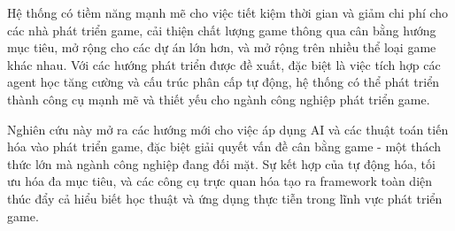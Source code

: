 Hệ thống có tiềm năng mạnh mẽ cho việc tiết kiệm thời gian và giảm chi phí cho các nhà phát triển game, cải thiện chất lượng game thông qua cân bằng hướng mục tiêu, mở rộng cho các dự án lớn hơn, và mở rộng trên nhiều thể loại game khác nhau. Với các hướng phát triển được đề xuất, đặc biệt là việc tích hợp các agent học tăng cường và cấu trúc phân cấp tự động, hệ thống có thể phát triển thành công cụ mạnh mẽ và thiết yếu cho ngành công nghiệp phát triển game.

Nghiên cứu này mở ra các hướng mới cho việc áp dụng AI và các thuật toán tiến hóa vào phát triển game, đặc biệt giải quyết vấn đề cân bằng game - một thách thức lớn mà ngành công nghiệp đang đối mặt. Sự kết hợp của tự động hóa, tối ưu hóa đa mục tiêu, và các công cụ trực quan hóa tạo ra framework toàn diện thúc đẩy cả hiểu biết học thuật và ứng dụng thực tiễn trong lĩnh vực phát triển game.
